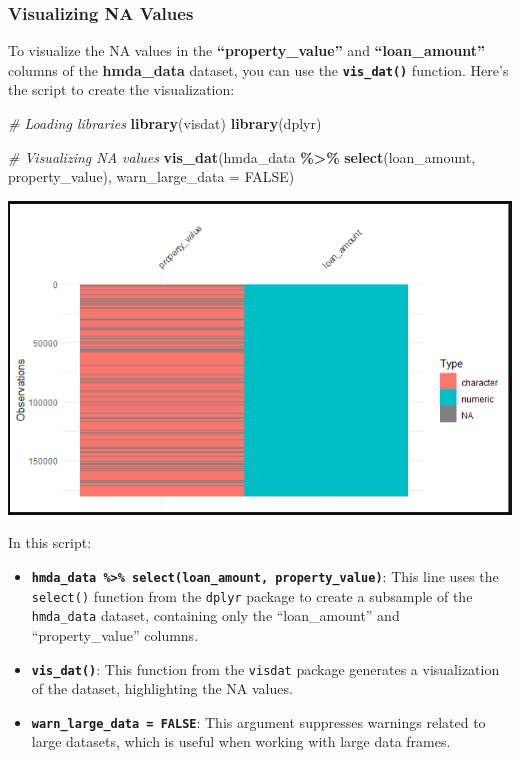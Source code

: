 \documentclass[
]{book}
\newenvironment{Shaded}{\begin{snugshade}}{\end{snugshade}}
\newcommand{\AttributeTok}[1]{\textcolor[rgb]{0.13,0.29,0.53}{#1}}
\newcommand{\CommentTok}[1]{\textcolor[rgb]{0.56,0.35,0.01}{\textit{#1}}}
\newcommand{\ConstantTok}[1]{\textcolor[rgb]{0.56,0.35,0.01}{#1}}
\newcommand{\FunctionTok}[1]{\textcolor[rgb]{0.13,0.29,0.53}{\textbf{#1}}}
\newcommand{\NormalTok}[1]{#1}
\newcommand{\SpecialCharTok}[1]{\textcolor[rgb]{0.81,0.36,0.00}{\textbf{#1}}}
\providecommand{\tightlist}{%
  \setlength{\itemsep}{0pt}\setlength{\parskip}{0pt}}
\begin{document}
\hypertarget{visualizing-na-values}{%
\subsubsection*{Visualizing NA Values}\label{visualizing-na-values}}

To visualize the NA values in the \textbf{``property\_value''} and \textbf{``loan\_amount''} columns of the \textbf{hmda\_data} dataset, you can use the \textbf{\texttt{vis\_dat()}} function. Here's the script to create the visualization:

\begin{Shaded}
\begin{Highlighting}[]
\CommentTok{\# Loading libraries}
\FunctionTok{library}\NormalTok{(visdat)}
\FunctionTok{library}\NormalTok{(dplyr)}

\CommentTok{\# Visualizing NA values}
\FunctionTok{vis\_dat}\NormalTok{(hmda\_data }\SpecialCharTok{\%\textgreater{}\%}
          \FunctionTok{select}\NormalTok{(loan\_amount, property\_value), }\AttributeTok{warn\_large\_data =} \ConstantTok{FALSE}\NormalTok{)}
\end{Highlighting}
\end{Shaded}

\includegraphics{images/na_visualization.PNG}

In this script:

\begin{itemize}
\tightlist
\item
  \textbf{\texttt{hmda\_data\ \%\textgreater{}\%\ select(loan\_amount,\ property\_value)}}: This line uses the \texttt{select()} function from the \texttt{dplyr} package to create a subsample of the \texttt{hmda\_data} dataset, containing only the ``loan\_amount'' and ``property\_value'' columns.
\item
  \textbf{\texttt{vis\_dat()}}: This function from the \texttt{visdat} package generates a visualization of the dataset, highlighting the NA values.
\item
  \textbf{\texttt{warn\_large\_data\ =\ FALSE}}: This argument suppresses warnings related to large datasets, which is useful when working with large data frames.
\end{itemize}
\end{document}
